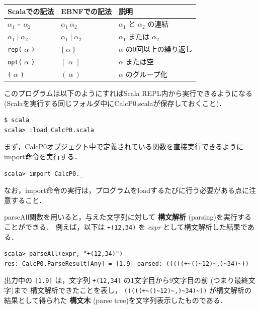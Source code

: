 \documentclass[a4j]{jsarticle}
\begin{document}
\begin{center}
\begin{tabular}{lll}
\hline
 Scalaでの記法                      &  EBNFでの記法              &  説明                             \\
\hline
 $\alpha_1$ \~{} $\alpha_2$         &  $\alpha_1\ \alpha_2$      &  $\alpha_1$ と $\alpha_2$ の連結  \\
 $\alpha_1 \mid \alpha_2$           &  $\alpha_1 \mid \alpha_2$  &  $\alpha_1$ または $\alpha_2$     \\
 \texttt{rep(} $\alpha$ \texttt{)}  &  $\{\ \alpha\ \}$          &  $\alpha$ の0回以上の繰り返し     \\
 \texttt{opt(} $\alpha$ \texttt{)}  &  $[\ \,\alpha\ \,]$        &  $\alpha$ または空                \\
 \texttt{(} $\alpha$ \texttt{)}     &  $(\ \alpha\ )$            &  $\alpha$ のグループ化            \\
\hline
\end{tabular}
\end{center}



このプログラムは以下のようにすればScala REPL内から実行できるようになる
(Scalaを実行する同じフォルダ中にCalcP0.scalaが保存しておくこと)．

\begin{verbatim}
$ scala
scala> :load CalcP0.scala
\end{verbatim}

まず，CalcP0オブジェクト中で定義されている関数を直接実行できるようにimport命令を実行する．

\begin{verbatim}
scala> import CalcP0._
\end{verbatim}
なお，import命令の実行は，プログラムをloadするたびに行う必要がある点に注意すること．

parseAll関数を用いると，与えた文字列に対して \textbf{構文解析} (parsing)を実行することができる．
例えば，以下は \texttt{+(12,34)} を \emph{expr} として構文解析した結果である．

\begin{verbatim}
scala> parseAll(expr, "+(12,34)")
res: CalcP0.ParseResult[Any] = [1.9] parsed: (((((+~()~12)~,)~34)~))
\end{verbatim}

出力中の \texttt{[1.9]} は，文字列 \texttt{+(12,34)} の1文字目から9文字目の前 (つまり最終文字)まで
構文解析できたことを表し，
\texttt{(((((+\textasciitilde{}()\textasciitilde{}12)\textasciitilde{},)\textasciitilde{}34)\textasciitilde{}))} が構文解析の結果として得られた \textbf{構文木} (parse tree)を文字列表示したものである．
\end{document}
